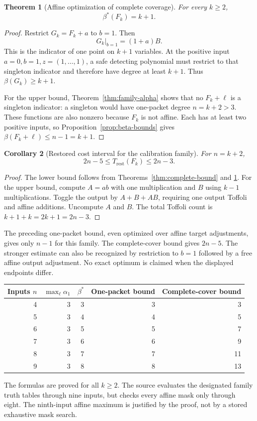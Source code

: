 \documentclass[11pt,letterpaper,oneside]{report}
\theoremstyle{komorebi}
\newtheorem{theorem}{Theorem}[chapter]
\newtheorem{corollary}[theorem]{Corollary}
\newcommand{\KTrest}{T_{\mathrm{rest}}}
\begin{document}
\begin{theorem}[Affine optimization of complete coverage]\label{thm:family-beta}
For every $k\ge2$,
\[
 \beta^*(F_k)=k+1.
\]
\end{theorem}
\begin{proof}
Restrict $G_k=F_k+a$ to $b=1$. Then
\[
 G_k|_{b=1}=(1+a)B.
\]
This is the indicator of one point on $k+1$ variables. At the positive input $a=0,b=1,z=(1,\ldots,1)$, a safe detecting polynomial must restrict to that singleton indicator and therefore have degree at least $k+1$. Thus $\beta(G_k)\ge k+1$.

For the upper bound, Theorem~\ref{thm:family-alpha} shows that no $F_k+\ell$ is a singleton indicator: a singleton would have one-packet degree $n=k+2>3$. These functions are also nonzero because $F_k$ is not affine. Each has at least two positive inputs, so Proposition~\ref{prop:beta-bounds} gives $\beta(F_k+\ell)\le n-1=k+1$.
\end{proof}

\begin{corollary}[Restored cost interval for the calibration family]\label{cor:family-cost}
For $n=k+2$,
\[
 2n-5\le\KTrest(F_k)\le2n-3.
\]
\end{corollary}
\begin{proof}
The lower bound follows from Theorems~\ref{thm:complete-bound} and \ref{thm:family-beta}. For the upper bound, compute $A=ab$ with one multiplication and $B$ using $k-1$ multiplications. Toggle the output by $A+B+AB$, requiring one output Toffoli and affine additions. Uncompute $A$ and $B$. The total Toffoli count is $k+1+k=2k+1=2n-3$.
\end{proof}

The preceding one-packet bound, even optimized over affine target adjustments, gives only $n-1$ for this family. The complete-cover bound gives $2n-5$. The stronger estimate can also be recognized by restriction to $b=1$ followed by a free affine output adjustment. No exact optimum is claimed when the displayed endpoints differ.

\begin{center}
\begin{tabular}{@{}rrrrr@{}}
\toprule
Inputs $n$ & $\max_\ell\alpha_1$ & $\beta^*$ & One-packet bound & Complete-cover bound\\\midrule
4 & 3 & 3 & 3 & 3\\
5 & 3 & 4 & 4 & 5\\
6 & 3 & 5 & 5 & 7\\
7 & 3 & 6 & 6 & 9\\
8 & 3 & 7 & 7 & 11\\
9 & 3 & 8 & 8 & 13\\
\bottomrule
\end{tabular}
\end{center}
The formulas are proved for all $k\ge2$. The source evaluates the designated family truth tables through nine inputs, but checks every affine mask only through eight. The ninth-input affine maximum is justified by the proof, not by a stored exhaustive mask search.
\end{document}
